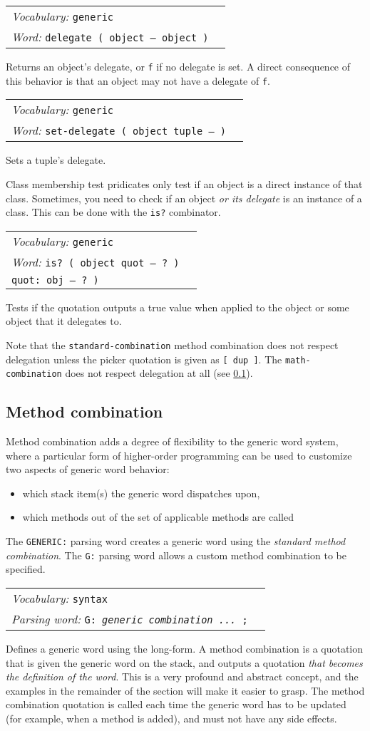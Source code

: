 \documentclass{book}
\newcommand{\vocabulary}[1]{\emph{Vocabulary:} \texttt{#1}&\\}
\newcommand{\parsingword}[2]{\index{\texttt{#1}}\emph{Parsing word:} \texttt{#2}&\\}
\newcommand{\ordinaryword}[2]{\index{\texttt{#1}}\emph{Word:} \texttt{#2}&\\}
\newcommand{\wordtable}[1]{


\begin{tabularx}{12cm}{lX}
\hline
#1
\hline
\end{tabularx}

}
\begin{document}
\wordtable{
\vocabulary{generic}
\ordinaryword{delegate}{delegate ( object -- object )}

}
Returns an object's delegate, or \texttt{f} if no delegate is set. A direct consequence of this behavior is that an object may not have a delegate of \texttt{f}.
\wordtable{
\vocabulary{generic}
\ordinaryword{set-delegate}{set-delegate ( object tuple -- )}
}
Sets a tuple's delegate.

Class membership test pridicates only test if an object is a direct instance of that class. Sometimes, you need to check if an object \emph{or its delegate} is an instance of a class. This can be done with the \verb|is?| combinator.

\wordtable{
\vocabulary{generic}
\ordinaryword{is?}{is?~( object quot -- ?~)}
\texttt{quot:~obj -- ?~)}\\
}

Tests if the quotation outputs a true value when applied to the object or some object that it delegates to.

Note that the \verb|standard-combination| method combination does not respect delegation unless the picker quotation is given as \verb|[ dup ]|. The \verb|math-combination| does not respect delegation at all (see \ref{combinations}).

\subsection{Method combination}\label{combinations}

Method combination adds a degree of flexibility to the generic word system, where a particular form of higher-order programming can be used to customize two aspects of generic word behavior:
\begin{itemize}
\item which stack item(s) the generic word dispatches upon,
\item which methods out of the set of applicable methods are called
\end{itemize}
The \verb|GENERIC:| parsing word creates a generic word using the \emph{standard method combination}. The \verb|G:| parsing word allows a custom method combination to be specified.
\wordtable{
\vocabulary{syntax}
\parsingword{G:}{G: \emph{generic} \emph{combination ...} ;}
}
Defines a generic word using the long-form.
A method combination is a quotation that is given the generic word on the stack, and outputs a quotation \emph{that becomes the definition of the word}. This is a very profound and abstract concept, and the examples in the remainder of the section will make it easier to grasp. The method combination quotation is called each time the generic word has to be updated (for example, when a method is added), and must not have any side effects.
\end{document}
